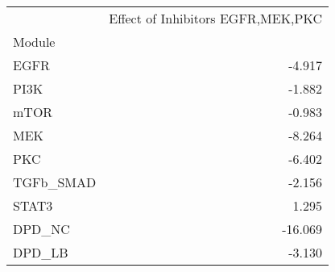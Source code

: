 \begin{tabular}{lr}
\toprule
{} &  Effect of Inhibitors EGFR,MEK,PKC \\
Module    &                                    \\
\midrule
EGFR      &                             -4.917 \\
PI3K      &                             -1.882 \\
mTOR      &                             -0.983 \\
MEK       &                             -8.264 \\
PKC       &                             -6.402 \\
TGFb\_SMAD &                             -2.156 \\
STAT3     &                              1.295 \\
DPD\_NC    &                            -16.069 \\
DPD\_LB    &                             -3.130 \\
\bottomrule
\end{tabular}
